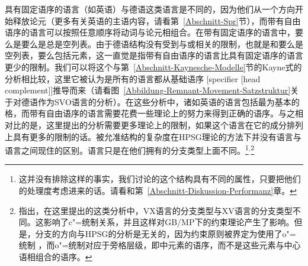 具有固定语序的语言（如英语）与德语这类语言是不同的，因为他们从一个方向开始释放论元（更多有关英语的主语内容，请看第~\ref{Abschnitt-Spr}节），而带有自由语序的语言可以按照任意顺序将动词与论元相组合。在带有固定语序的语言中，要么是要么是总是空列表。由于德语结构没有受到与或相关的限制，也就是和要么是空列表，要么包括元素，这一直觉是指带有自由语序的语言比具有固定语序的语言更少的限制。我们可以将这个与第~\ref{Abschnitt-Kaynesche-Modelle}节的Kayne式的分析相比较，这里它被认为是所有的语言都从基础语序 [specifier [head complement]]推导而来（请看图~\vref{Abbildung-Remnant-Movement-Satzstruktur}关于对德语作为SVO语言的分析\citep{Laenzlinger2004a}）。在这些分析中，诸如英语的语言包括最为基本的格，而带有自由语序的语言需要花费一些理论上的努力来得到正确的语序。与之相对比的是，这里提出的分析需要更多理论上的限制，如果这个语言在它的成分排列上具有更多的限制的话。被允准结构的复杂度在HPSG理论的方法下并没有语言与语言之间现住的区别。语言只是在他们拥有的分支类型上面不同。\footnote{ 
这并没有排除这样的事实，我们讨论的这个结构具有不同的属性，只要把他们的处理度考虑进来的话。请看和第~\ref{Abschnitt-Diskussion-Performanz}章。
}$^,$\footnote{%
\citet[]{Haider97c}指出，在这里提出的这类分析中，VX语言的分支类型与XV语言的分支类型不同。这影响了c"=统制关系，并且这样对GB/MP下的约束理论产生了影响。但是，分支的方向与HPSG的分析是无关的，因为约束原则被界定为使用了o"=统制 \citep[Chapter~6]{ps2}，而o"=统制对应于旁格层级，即\subcatl 中元素的语序，而不是这些元素与中心语相组合的语序。
}
